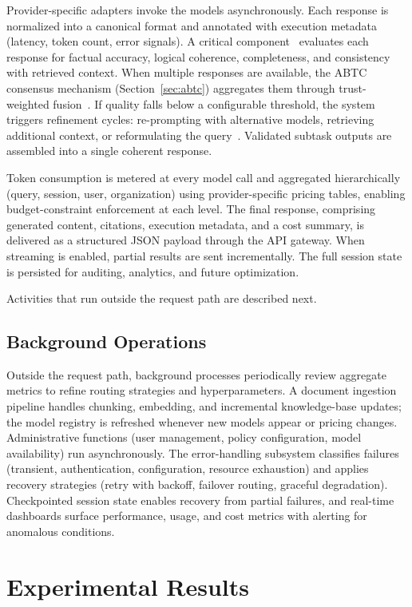 \documentclass{iopjournal}
\begin{document}
Provider-specific adapters invoke the models asynchronously. Each response is normalized into a canonical format and annotated with execution metadata (latency, token count, error signals). A critical component~\cite{Reflexion} evaluates each response for factual accuracy, logical coherence, completeness, and consistency with retrieved context. When multiple responses are available, the ABTC consensus mechanism (Section~\ref{sec:abtc}) aggregates them through trust-weighted fusion~\cite{MACollab}. If quality falls below a configurable threshold, the system triggers refinement cycles: re-prompting with alternative models, retrieving additional context, or reformulating the query~\cite{SelfRefine}. Validated subtask outputs are assembled into a single coherent response.

Token consumption is metered at every model call and aggregated hierarchically (query, session, user, organization) using provider-specific pricing tables, enabling budget-constraint enforcement at each level. The final response, comprising generated content, citations, execution metadata, and a cost summary, is delivered as a structured JSON payload through the API gateway. When streaming is enabled, partial results are sent incrementally. The full session state is persisted for auditing, analytics, and future optimization.

Activities that run outside the request path are described next.

\subsection{Background Operations}

Outside the request path, background processes periodically review aggregate metrics to refine routing strategies and hyperparameters. A document ingestion pipeline handles chunking, embedding, and incremental knowledge-base updates; the model registry is refreshed whenever new models appear or pricing changes. Administrative functions (user management, policy configuration, model availability) run asynchronously. The error-handling subsystem classifies failures (transient, authentication, configuration, resource exhaustion) and applies recovery strategies (retry with backoff, failover routing, graceful degradation). Checkpointed session state enables recovery from partial failures, and real-time dashboards surface performance, usage, and cost metrics with alerting for anomalous conditions.

\section{Experimental Results}
\label{sec:exp}
\end{document}
